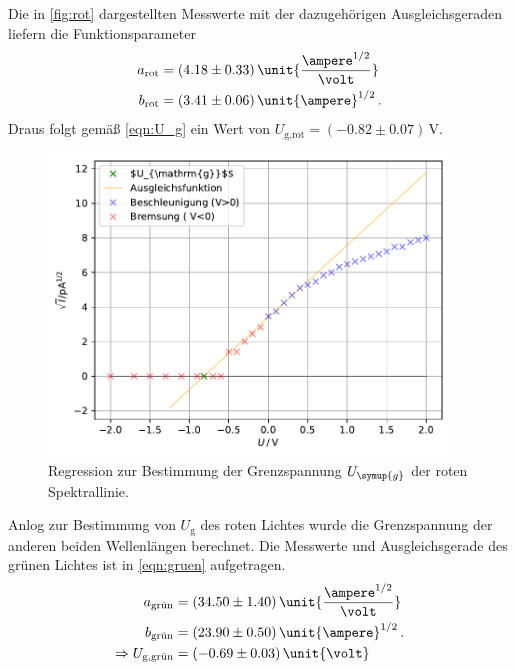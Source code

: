 Die in \autoref{fig:rot} dargestellten Messwerte mit der dazugehörigen Ausgleichsgeraden liefern die Funktionsparameter 
\begin{align*}
    a_{\text{rot}}&=(4.18\pm 0.33) \, \unit{\frac{\ampere ^{1/2}}{\volt}}\\
    b_{\text{rot}}&=(3.41\pm 0.06) \, \unit{\ampere}^{1/2}\, .\\
\end{align*}
Draus folgt gemäß \autoref{eqn:U_g} ein Wert von $U_{\text{g,rot}}=(-0.82\pm 0.07)\, \unit{\volt}$.
\begin{figure}
    \centering
    \includegraphics[height = 8cm]{build/plotrot.pdf}
    \caption{Regression zur Bestimmung der Grenzspannung $U_{\symup{g}}$ der roten Spektrallinie.}
    \label{fig:rot}
\end{figure}
Anlog zur Bestimmung von $U_{\text{g}}$ des roten Lichtes wurde die Grenzspannung der anderen beiden Wellenlängen 
berechnet.
Die Messwerte und Ausgleichsgerade des grünen Lichtes ist in \autoref{eqn:gruen} aufgetragen.
\begin{align*}
    a_{\text{grün}}&=(34.50\pm 1.40) \, \unit{\frac{\ampere ^{1/2}}{\volt}}\\
    b_{\text{grün}}&=(23.90\pm 0.50) \, \unit{\ampere}^{1/2}\, .\\
    \Rightarrow U_{\text{g,grün}}&=(-0.69\pm 0.03)\, \unit{\volt}\\
\end{align*}

